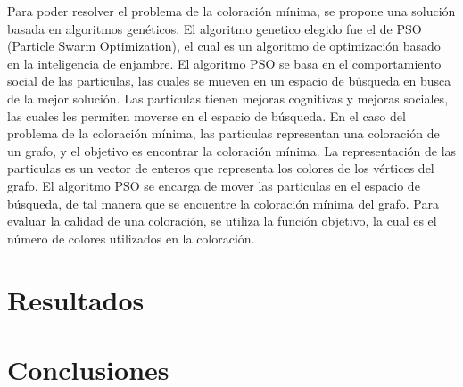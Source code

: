 \documentclass[9pt,a4paper,twoside]{tau-class/tau}
\begin{document}
    Para poder resolver el problema de la coloración mínima, se propone una solución basada en algoritmos genéticos.
    El algoritmo genetico elegido fue el de PSO (Particle Swarm Optimization), el cual es un algoritmo de optimización basado en la inteligencia de enjambre.
    El algoritmo PSO se basa en el comportamiento social de las particulas, las cuales se mueven en un espacio de búsqueda en busca de la mejor solución.
    Las particulas tienen mejoras cognitivas y mejoras sociales, las cuales les permiten moverse en el espacio de búsqueda.
    En el caso del problema de la coloración mínima, las particulas representan una coloración de un grafo, y el objetivo es encontrar la coloración mínima.
    La representación de las particulas es un vector de enteros que representa los colores de los vértices del grafo.
    El algoritmo PSO se encarga de mover las particulas en el espacio de búsqueda, de tal manera que se encuentre la coloración mínima del grafo.
    Para evaluar la calidad de una coloración, se utiliza la función objetivo, la cual es el número de colores utilizados en la coloración.


\section{Resultados}


\section{Conclusiones}


\printbibliography
\end{document}
